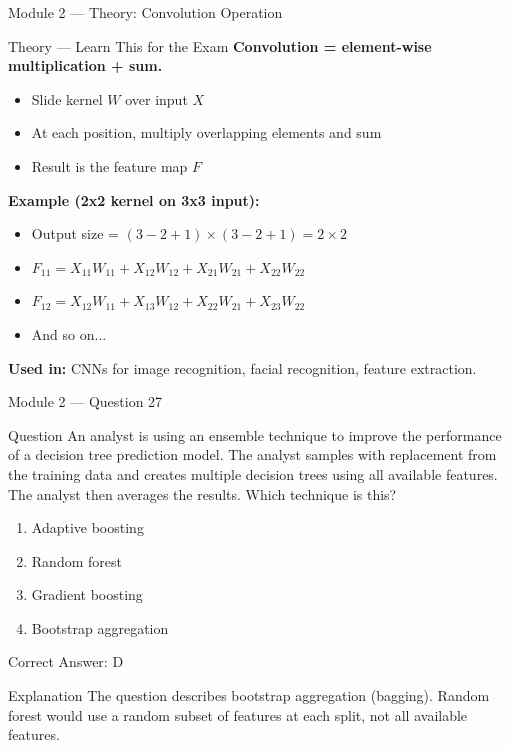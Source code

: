 \documentclass[aspectratio=169,10pt]{beamer}
\newcommand{\question}[1]{%
	\begin{block}{Question}
		#1
	\end{block}
}
\newcommand{\options}[4]{%
	\begin{enumerate}[label=\Alph*.,leftmargin=*]
		\item #1
		\item #2
		\item #3
		\item #4
	\end{enumerate}
}
\newcommand{\answerbox}[1]{%
	\begin{exampleblock}{Correct Answer: #1}
	\end{exampleblock}
}
\newcommand{\explain}[1]{%
	\begin{block}{Explanation}
		\small #1
	\end{block}
}
\newcommand{\theory}[1]{%
	\begin{block}{Theory --- Learn This for the Exam}
		\small #1
	\end{block}
}
\begin{document}
	\begin{frame}{Module 2 --- Theory: Convolution Operation}
		\theory{
			\textbf{Convolution = element-wise multiplication + sum.}
			\begin{itemize}
				\item Slide kernel $W$ over input $X$
				\item At each position, multiply overlapping elements and sum
				\item Result is the feature map $F$
			\end{itemize}
			\textbf{Example (2x2 kernel on 3x3 input):}
			\begin{itemize}
				\item Output size = $(3-2+1) \times (3-2+1) = 2 \times 2$
				\item $F_{11} = X_{11}W_{11} + X_{12}W_{12} + X_{21}W_{21} + X_{22}W_{22}$
				\item $F_{12} = X_{12}W_{11} + X_{13}W_{12} + X_{22}W_{21} + X_{23}W_{22}$
				\item And so on...
			\end{itemize}
			\textbf{Used in:} CNNs for image recognition, facial recognition, feature extraction.
		}
	\end{frame}
	
	\begin{frame}{Module 2 --- Question 27}
		\question{An analyst is using an ensemble technique to improve the performance of a decision tree prediction model. The analyst samples with replacement from the training data and creates multiple decision trees using all available features. The analyst then averages the results. Which technique is this?}
		\options{Adaptive boosting}{Random forest}{Gradient boosting}{Bootstrap aggregation}
		\answerbox{D}
		\explain{The question describes bootstrap aggregation (bagging). Random forest would use a random subset of features at each split, not all available features.}
	\end{frame}
	
\end{document}
